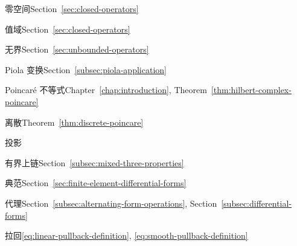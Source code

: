 \begin{theindex}
\subitem {}\label{index:operator-null-space}{零空间}\quad Section~\ref{sec:closed-operators}

\subitem {}\label{index:operator-range}{值域}\quad Section~\ref{sec:closed-operators}

\subitem {}\label{index:operator-unbounded}{无界}\quad Section~\ref{sec:unbounded-operators}

\item {}\label{index:piola-transform}{Piola 变换}\quad Section~\ref{subsec:piola-application}

\item {}\label{index:poincar-inequality}{Poincaré 不等式}\quad Chapter~\ref{chap:introduction}, Theorem~\ref{thm:hilbert-complex-poincare}

\subitem {}\label{index:poincar-inequality-discrete}{离散}\quad Theorem~\ref{thm:discrete-poincare}

\item {}\label{index:projection}{投影}

\subitem {}\label{index:projection-bounded-cochain}{有界上链}\quad Section~\ref{subsec:mixed-three-properties}

\subitem {}\label{index:projection-canonical}{典范}\quad Section~\ref{sec:finite-element-differential-forms}

\item {}\label{index:proxy}{代理}\quad Section~\ref{subsec:alternating-form-operations}, Section~\ref{subsec:differential-forms}

\item {}\label{index:pullback}{拉回}\quad \eqref{eq:linear-pullback-definition}, \eqref{eq:smooth-pullback-definition}


\end{theindex}
